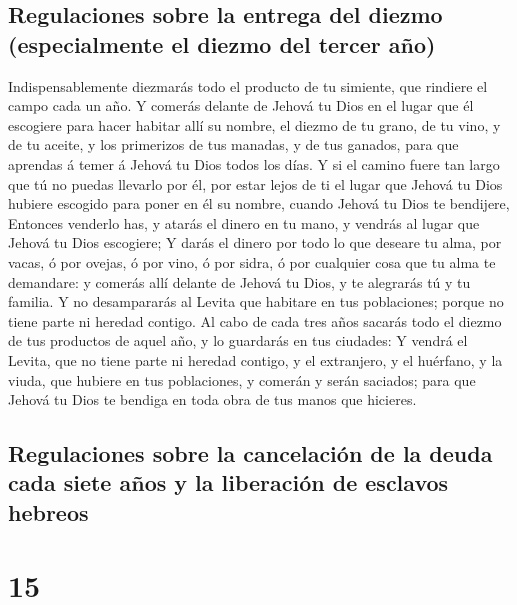 \hypertarget{regulaciones-sobre-la-entrega-del-diezmo-especialmente-el-diezmo-del-tercer-auxf1o}{%
\subsection{Regulaciones sobre la entrega del diezmo (especialmente el
diezmo del tercer
año)}\label{regulaciones-sobre-la-entrega-del-diezmo-especialmente-el-diezmo-del-tercer-auxf1o}}

 Indispensablemente diezmarás todo el producto de tu
simiente, que rindiere el campo cada un año.  Y comerás
delante de Jehová tu Dios en el lugar que él escogiere para hacer
habitar allí su nombre, el diezmo de tu grano, de tu vino, y de tu
aceite, y los primerizos de tus manadas, y de tus ganados, para que
aprendas á temer á Jehová tu Dios todos los días.  Y si el
camino fuere tan largo que tú no puedas llevarlo por él, por estar lejos
de ti el lugar que Jehová tu Dios hubiere escogido para poner en él su
nombre, cuando Jehová tu Dios te bendijere,  Entonces
venderlo has, y atarás el dinero en tu mano, y vendrás al lugar que
Jehová tu Dios escogiere;  Y darás el dinero por todo lo
que deseare tu alma, por vacas, ó por ovejas, ó por vino, ó por sidra, ó
por cualquier cosa que tu alma te demandare: y comerás allí delante de
Jehová tu Dios, y te alegrarás tú y tu familia.  Y no
desampararás al Levita que habitare en tus poblaciones; porque no tiene
parte ni heredad contigo.  Al cabo de cada tres años
sacarás todo el diezmo de tus productos de aquel año, y lo guardarás en
tus ciudades:  Y vendrá el Levita, que no tiene parte ni
heredad contigo, y el extranjero, y el huérfano, y la viuda, que hubiere
en tus poblaciones, y comerán y serán saciados; para que Jehová tu Dios
te bendiga en toda obra de tus manos que hicieres.

\hypertarget{regulaciones-sobre-la-cancelaciuxf3n-de-la-deuda-cada-siete-auxf1os-y-la-liberaciuxf3n-de-esclavos-hebreos}{%
\subsection{Regulaciones sobre la cancelación de la deuda cada siete
años y la liberación de esclavos
hebreos}\label{regulaciones-sobre-la-cancelaciuxf3n-de-la-deuda-cada-siete-auxf1os-y-la-liberaciuxf3n-de-esclavos-hebreos}}

\hypertarget{section-14}{%
\section{15}\label{section-14}}

